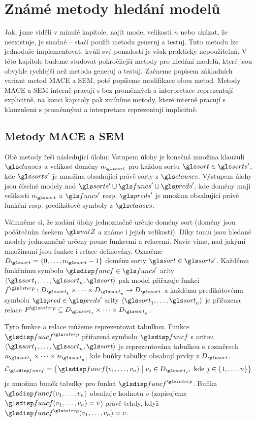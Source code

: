 \chapter{Známé metody hledání modelů}

Jak, jsme viděli v minulé kapitole, najít model
velikosti $n$ nebo ukázat, že neexistuje, je snadné --
stačí použít metodu generuj a testuj.
Tuto metodu lze jednoduše implementovat,
kvůli své pomalosti je však prakticky nepoužitelná.
V této kapitole budeme studovat pokročilejší metody
pro hledání modelů, které jsou obvykle rychlejší
než metoda generuj a testuj.
Začneme popisem základních variant metod MACE a SEM,
poté popíšeme modifikace obou metod.
Metody MACE a SEM interně pracují s  bez proměnných
a interpretace reprezentují explicitně,
na konci kapitoly pak zmíníme metody, které interně
pracují s klauzulemi s proměnnými a interpretace reprezentují
implicitně.

\section{Metody MACE a SEM}

Obě metody řeší následující úlohu:
Vstupem úlohy je konečná množina
klauzulí $\clauses$ a velikost domény $n_\sort$
pro každou sortu $\sort \in \sorts'$, kde $\sorts'$ je množina
obsahující právě sorty z $\clauses$. Výstupem úlohy jsou číselné modely
nad $\sorts' \cup \funcs' \cup \preds'$, kde domény mají velikosti
$n_\sort$ a $\funcs'$ resp. $\preds'$ je množina obsahující právě funkční
resp. predikátové symboly z $\clauses$.

Všimněme si, že zadání úlohy jednoznačně určuje domény sort
(domény jsou počátečním úsekem $\natZ$ a známe i jejich velikosti).
Díky tomu jsou hledané modely jednoznačně určeny pouze funkcemi a relacemi.
Navíc víme, nad jakými množinami jsou funkce i relace definovány.
Označme $D_\sort = \{ 0 \comdots n_\sort - 1 \}$ doménu
sorty $\sort \in \sorts'$.
Každému funkčnímu symbolu $\func \in \funcs'$ arity
$\langle \sort_1 \comdots \sort_n, \sort \rangle$ pak model přiřazuje funkci
$f^\interp : D_{\sort_1} \timdots D_{\sort_n} \to D_\sort$
a každému predikátovému symbolu $\pred \in \preds'$ arity
$\langle \sort_1 \comdots \sort_n \rangle$
je přiřazena relace $P^\interp \subseteq D_{\sort_1} \timdots D_{\sort_n}$.

\newcommand\cells{\ensuremath{\mathcal{C}}}

Tyto funkce a relace můžeme reprezentovat tabulkou.
Funkce $\func^\interp$ přiřazená symbolu $\func$
s aritou $\langle \sort_1 \comdots \sort_n, \sort \rangle$
je reprezentována tabulkou o rozměrech $n_{\sort_1} \timdots n_{\sort_n}$,
kde buňky tabulky obsahují prvky z $D_\sort$.
\[
\cells_\func = \bigl\{ \func(v_1 \comdots v_n) \bigm| v_j \in D_{\sort_j},
  \text{ kde } j \in \{ 1 \comdots n  \}  \bigr\}
\]
je množina buněk tabulky pro funkci $\func^\interp$.
Buňka $\func(v_1 \comdots v_n)$ obsahuje hodnotu $v$ (zapisujeme
$\func(v_1 \comdots v_n) = v$) právě tehdy,
když $\func^\interp(v_1 \comdots v_n) = v$.

